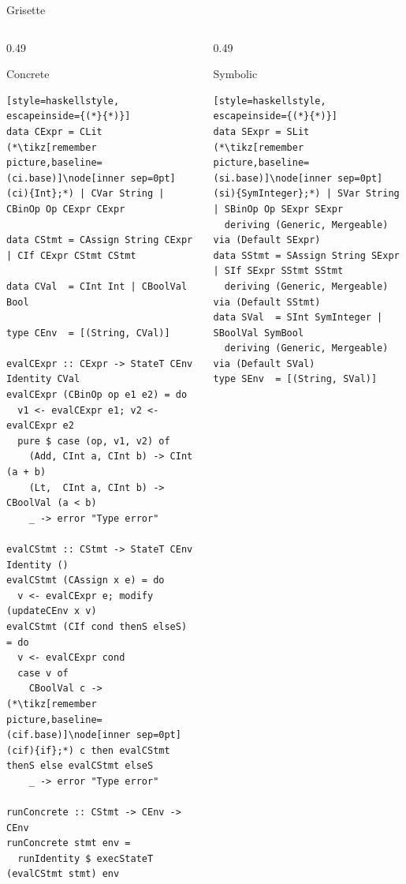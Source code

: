 \documentclass[aspectratio=169]{beamer}
\begin{document}
\begin{frame}[fragile]{Grisette}
\vspace{-1cm}
\begin{columns}[T,onlytextwidth]

\begin{column}{0.49\textwidth}
\begin{block}{\centering Concrete}
\begin{lstlisting}[style=haskellstyle, escapeinside={(*}{*)}]
data CExpr = CLit (*\tikz[remember picture,baseline=(ci.base)]\node[inner sep=0pt](ci){Int};*) | CVar String | CBinOp Op CExpr CExpr

data CStmt = CAssign String CExpr | CIf CExpr CStmt CStmt

data CVal  = CInt Int | CBoolVal Bool

type CEnv  = [(String, CVal)]

evalCExpr :: CExpr -> StateT CEnv Identity CVal
evalCExpr (CBinOp op e1 e2) = do
  v1 <- evalCExpr e1; v2 <- evalCExpr e2
  pure $ case (op, v1, v2) of
    (Add, CInt a, CInt b) -> CInt (a + b)
    (Lt,  CInt a, CInt b) -> CBoolVal (a < b)
    _ -> error "Type error"

evalCStmt :: CStmt -> StateT CEnv Identity ()
evalCStmt (CAssign x e) = do
  v <- evalCExpr e; modify (updateCEnv x v)
evalCStmt (CIf cond thenS elseS) = do
  v <- evalCExpr cond
  case v of
    CBoolVal c -> (*\tikz[remember picture,baseline=(cif.base)]\node[inner sep=0pt](cif){if};*) c then evalCStmt thenS else evalCStmt elseS
    _ -> error "Type error"

runConcrete :: CStmt -> CEnv -> CEnv
runConcrete stmt env =
  runIdentity $ execStateT (evalCStmt stmt) env
\end{lstlisting}
\end{block}
\end{column}

\begin{column}{0.49\textwidth}
\begin{block}{\centering Symbolic}
\begin{lstlisting}[style=haskellstyle, escapeinside={(*}{*)}]
data SExpr = SLit (*\tikz[remember picture,baseline=(si.base)]\node[inner sep=0pt](si){SymInteger};*) | SVar String | SBinOp Op SExpr SExpr
  deriving (Generic, Mergeable) via (Default SExpr)
data SStmt = SAssign String SExpr | SIf SExpr SStmt SStmt
  deriving (Generic, Mergeable) via (Default SStmt)
data SVal  = SInt SymInteger | SBoolVal SymBool
  deriving (Generic, Mergeable) via (Default SVal)
type SEnv  = [(String, SVal)]


\end{lstlisting}
\end{block}
\end{column}
\end{columns}
\end{frame}
\end{document}
